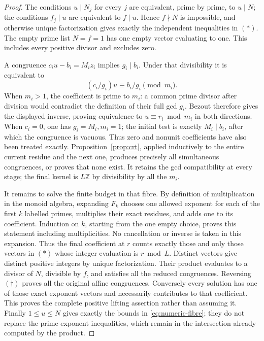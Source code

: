 \documentclass[11pt]{article}
\theoremstyle{definition}\newtheorem{definition}[theorem]{Definition}
\theoremstyle{remark}\newtheorem{remark}[theorem]{Remark}
\newcommand{\Z}{\mathbb Z}\newcommand{\Q}{\mathbb Q}
\begin{document}
\begin{proof}
The conditions \(u\mid N_j\) for every \(j\) are equivalent,
prime by prime, to \(u\mid N\); the conditions \(f_j\mid u\)
are equivalent to \(f\mid u\).  Hence \(f\nmid N\) is
impossible, and otherwise unique factorization gives exactly
the independent inequalities in \((\ast)\).  The empty
prime list \(N=f=1\) has one empty vector evaluating to one.
This includes every positive divisor and excludes zero.

A congruence \(c_i u-b_i=M_i z_i\) implies \(g_i\mid b_i\).
Under that divisibility it is equivalent to
\[
 (c_i/g_i)u\equiv b_i/g_i\pmod{m_i}.
 \tag{\(\dagger\)}
\]
When \(m_i>1\), the coefficient is prime to \(m_i\):
a common prime divisor after division would contradict the
definition of their full gcd \(g_i\).  Bezout therefore
gives the displayed inverse, proving equivalence to
\(u\equiv r_i\bmod m_i\) in both directions.
When \(c_i=0\), one has \(g_i=M_i,m_i=1\);
the initial test is exactly \(M_i\mid b_i\), after which
the congruence is vacuous.  Thus zero and nonunit
coefficients have also been treated exactly.
Proposition~\ref{prop:crt}, applied inductively to the
entire current residue and the next one, produces precisely
all simultaneous congruences, or proves that none exist.
It retains the gcd compatibility at every stage; the final
kernel is \(L\Z\) by divisibility by all the \(m_i\).

It remains to solve the finite budget in that fibre.
By definition of multiplication in the monoid algebra,
expanding \(F_k\) chooses one allowed exponent for each of
the first \(k\) labelled primes, multiplies their exact
residues, and adds one to its coefficient.  Induction on
\(k\), starting from the one empty choice, proves this
statement including multiplicities.  No cancellation or
inverse is taken in this expansion.  Thus the final
coefficient at \(r\) counts exactly those and only those
vectors in \((\ast)\) whose integer evaluation is \(r\bmod L\).
Distinct vectors give distinct positive integers by unique
factorization.  Their product evaluates to a divisor of
\(N\), divisible by \(f\), and satisfies all the reduced
congruences.  Reversing \((\dagger)\) proves all the
original affine congruences.  Conversely every solution
has one of those exact exponent vectors and necessarily
contributes to that coefficient.  This proves the
complete positive lifting assertion rather than assuming
it.  Finally \(1\le u\le N\) gives exactly the bounds
in \eqref{eq:numeric-fibre}; they do not replace the
prime-exponent inequalities, which remain in the
intersection already computed by the product.
\end{proof}
\end{document}

